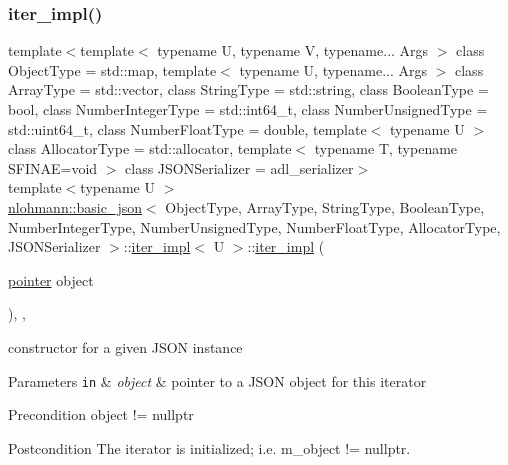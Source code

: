 \subsubsection{\texorpdfstring{iter\+\_\+impl()}{iter\_impl()}\hspace{0.1cm}{\footnotesize\ttfamily [2/3]}}
{\footnotesize\ttfamily template$<$template$<$ typename U, typename V, typename... Args $>$ class Object\+Type = std\+::map, template$<$ typename U, typename... Args $>$ class Array\+Type = std\+::vector, class String\+Type  = std\+::string, class Boolean\+Type  = bool, class Number\+Integer\+Type  = std\+::int64\+\_\+t, class Number\+Unsigned\+Type  = std\+::uint64\+\_\+t, class Number\+Float\+Type  = double, template$<$ typename U $>$ class Allocator\+Type = std\+::allocator, template$<$ typename T, typename S\+F\+I\+N\+A\+E=void $>$ class J\+S\+O\+N\+Serializer = adl\+\_\+serializer$>$ \\
template$<$typename U $>$ \\
\hyperlink{classnlohmann_1_1basic__json}{nlohmann\+::basic\+\_\+json}$<$ Object\+Type, Array\+Type, String\+Type, Boolean\+Type, Number\+Integer\+Type, Number\+Unsigned\+Type, Number\+Float\+Type, Allocator\+Type, J\+S\+O\+N\+Serializer $>$\+::\hyperlink{classnlohmann_1_1basic__json_1_1iter__impl}{iter\+\_\+impl}$<$ U $>$\+::\hyperlink{classnlohmann_1_1basic__json_1_1iter__impl}{iter\+\_\+impl} (\begin{DoxyParamCaption}\item[{\hyperlink{classnlohmann_1_1basic__json_1_1iter__impl_a3dddd7fa38b36e2531700ceb4a1ce9a8}{pointer}}]{object }\end{DoxyParamCaption})\hspace{0.3cm}{\ttfamily [inline]}, {\ttfamily [explicit]}, {\ttfamily [noexcept]}}



constructor for a given J\+S\+ON instance 


\begin{DoxyParams}[1]{Parameters}
\mbox{\tt in}  & {\em object} & pointer to a J\+S\+ON object for this iterator \\
\hline
\end{DoxyParams}
\begin{DoxyPrecond}{Precondition}
object != nullptr 
\end{DoxyPrecond}
\begin{DoxyPostcond}{Postcondition}
The iterator is initialized; i.\+e. {\ttfamily m\+\_\+object != nullptr}. 
\end{DoxyPostcond}
\mbox{\label{classnlohmann_1_1basic__json_1_1iter__impl_a94c010c069b5aed9e064e0579eac9a64}} 
